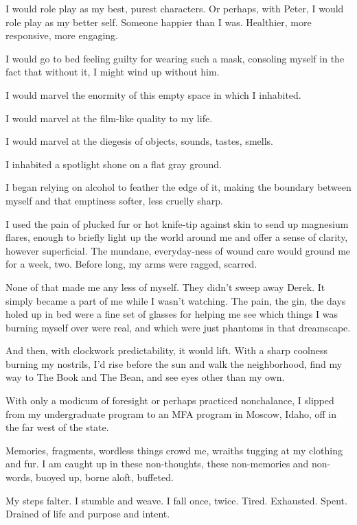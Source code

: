 I would role play as my best, purest characters. Or perhaps, with Peter, I would role play as my better self. Someone happier than I was. Healthier, more responsive, more engaging.

I would go to bed feeling guilty for wearing such a mask, consoling myself in the fact that without it, I might wind up without him.

I would marvel the enormity of this empty space in which I inhabited.

I would marvel at the film-like quality to my life.

I would marvel at the diegesis of objects, sounds, tastes, smells.

I inhabited a spotlight shone on a flat gray ground.

I began relying on alcohol to feather the edge of it, making the boundary between myself and that emptiness softer, less cruelly sharp.

I used the pain of plucked fur or hot knife-tip against skin to send up magnesium flares, enough to briefly light up the world around me and offer a sense of clarity, however superficial. The mundane, everyday-ness of wound care would ground me for a week, two. Before long, my arms were ragged, scarred.

None of that made me any less of myself. They didn't sweep away Derek. It simply became a part of me while I wasn't watching. The pain, the gin, the days holed up in bed were a fine set of glasses for helping me see which things I was burning myself over were real, and which were just phantoms in that dreamscape.

And then, with clockwork predictability, it would lift. With a sharp coolness burning my nostrils, I'd rise before the sun and walk the neighborhood, find my way to The Book and The Bean, and see eyes other than my own.

With only a modicum of foresight or perhaps practiced nonchalance, I slipped from my undergraduate program to an MFA program in Moscow, Idaho, off in the far west of the state.

\secdiv{}

\noindent Memories, fragments, wordless things crowd me, wraiths tugging at my clothing and fur. I am caught up in these non-thoughts, these non-memories and non-words, buoyed up, borne aloft, buffeted.

My steps falter. I stumble and weave. I fall once, twice. Tired. Exhausted. Spent. Drained of life and purpose and intent.

